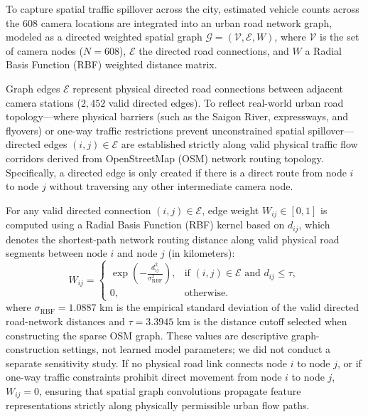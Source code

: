 \documentclass[preprint,12pt]{elsarticle}
\begin{document}
To capture spatial traffic spillover across the city, estimated vehicle counts across the 608 camera locations are integrated into an urban road network graph, modeled as a directed weighted spatial graph $\mathcal{G} = (\mathcal{V}, \mathcal{E}, W)$, where $\mathcal{V}$ is the set of camera nodes ($N=608$), $\mathcal{E}$ the directed road connections, and $W$ a Radial Basis Function (RBF) weighted distance matrix.

Graph edges $\mathcal{E}$ represent physical directed road connections between adjacent camera stations ($2,452$ valid directed edges). To reflect real-world urban road topology---where physical barriers (such as the Saigon River, expressways, and flyovers) or one-way traffic restrictions prevent unconstrained spatial spillover---directed edges $(i,j) \in \mathcal{E}$ are established strictly along valid physical traffic flow corridors derived from OpenStreetMap (OSM) network routing topology. Specifically, a directed edge is only created if there is a direct route from node $i$ to node $j$ without traversing any other intermediate camera node.

For any valid directed connection $(i,j) \in \mathcal{E}$, edge weight $W_{ij} \in [0, 1]$ is computed using a Radial Basis Function (RBF) kernel based on $d_{ij}$, which denotes the shortest-path network routing distance along valid physical road segments between node $i$ and node $j$ (in kilometers):
\begin{equation}
W_{ij} =
\begin{cases}
\exp\left(
-\frac{d_{ij}^2}{\sigma_{\mathrm{RBF}}^2}
\right),
& \text{if } (i,j) \in \mathcal{E} \text{ and } d_{ij} \le \tau, \\
0,
& \text{otherwise.}
\end{cases}
\end{equation}
where $\sigma_{\mathrm{RBF}} = 1.0887$ km is the empirical standard deviation of the valid directed road-network distances and $\tau = 3.3945$ km is the distance cutoff selected when constructing the sparse OSM graph. These values are descriptive graph-construction settings, not learned model parameters; we did not conduct a separate sensitivity study. If no physical road link connects node $i$ to node $j$, or if one-way traffic constraints prohibit direct movement from node $i$ to node $j$, $W_{ij} = 0$, ensuring that spatial graph convolutions propagate feature representations strictly along physically permissible urban flow paths.
\end{document}
